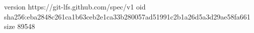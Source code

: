 version https://git-lfs.github.com/spec/v1
oid sha256:eba2848c261ca1b63ceb2e1ca33b280057ad51991c2b1a26d5a3d29ae58fa661
size 89548
